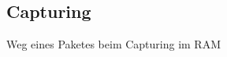 \documentclass{beamer}
\begin{document}

\subsection*{Capturing}
\begin{frame}
	\begin{center}
	\huge{Weg eines Paketes beim Capturing im RAM}
	\end{center}
\end{frame}
\end{document}
